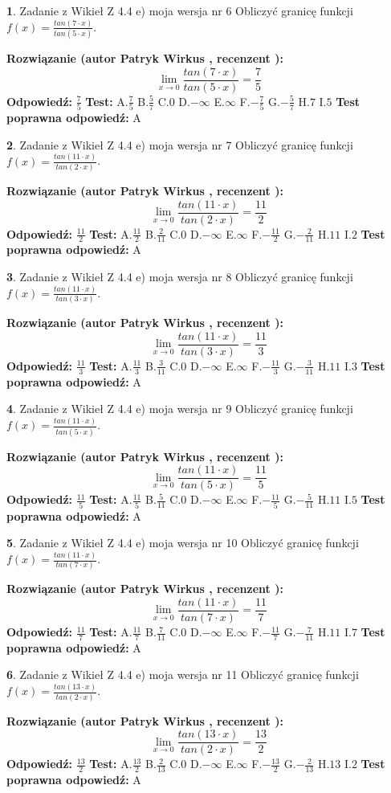 \documentclass[12pt, a4paper]{article}
\theoremstyle{definition} %
\newtheorem{zad}{}
\newcommand{\zadStart}[1]{\begin{zad}#1\newline}
\newcommand{\zadStop}{\end{zad}}
\newcommand{\rozwStart}[2]{\noindent \textbf{Rozwiązanie (autor #1 , recenzent #2): }\newline}
\newcommand{\rozwStop}{\newline}
\newcommand{\odpStart}{\noindent \textbf{Odpowiedź:}\newline}
\newcommand{\odpStop}{\newline}
\newcommand{\testStart}{\noindent \textbf{Test:}\newline}
\newcommand{\testStop}{\newline}
\newcommand{\kluczStart}{\noindent \textbf{Test poprawna odpowiedź:}\newline}
\newcommand{\kluczStop}{\newline}
\begin{document}
\zadStart{Zadanie z Wikieł Z 4.4 e) moja wersja nr 6}
Obliczyć granicę funkcji $f(x)=\frac{tan(7\cdot x)}{tan(5\cdot x)}$.
\zadStop
\rozwStart{Patryk Wirkus}{}
$$\lim\limits_{x\to 0}\frac{tan(7\cdot x)}{tan(5\cdot x)}=
\frac{7}{5}$$
\rozwStop
\odpStart
$\frac{7}{5}$
\odpStop
\testStart
A.$\frac{7}{5}$
B.$\frac{5}{7}$
C.$0$
D.$-\infty$
E.$\infty$
F.$-\frac{7}{5}$
G.$-\frac{5}{7}$
H.$7$
I.$5$
\testStop
\kluczStart
A
\kluczStop



\zadStart{Zadanie z Wikieł Z 4.4 e) moja wersja nr 7}
Obliczyć granicę funkcji $f(x)=\frac{tan(11\cdot x)}{tan(2\cdot x)}$.
\zadStop
\rozwStart{Patryk Wirkus}{}
$$\lim\limits_{x\to 0}\frac{tan(11\cdot x)}{tan(2\cdot x)}=
\frac{11}{2}$$
\rozwStop
\odpStart
$\frac{11}{2}$
\odpStop
\testStart
A.$\frac{11}{2}$
B.$\frac{2}{11}$
C.$0$
D.$-\infty$
E.$\infty$
F.$-\frac{11}{2}$
G.$-\frac{2}{11}$
H.$11$
I.$2$
\testStop
\kluczStart
A
\kluczStop



\zadStart{Zadanie z Wikieł Z 4.4 e) moja wersja nr 8}
Obliczyć granicę funkcji $f(x)=\frac{tan(11\cdot x)}{tan(3\cdot x)}$.
\zadStop
\rozwStart{Patryk Wirkus}{}
$$\lim\limits_{x\to 0}\frac{tan(11\cdot x)}{tan(3\cdot x)}=
\frac{11}{3}$$
\rozwStop
\odpStart
$\frac{11}{3}$
\odpStop
\testStart
A.$\frac{11}{3}$
B.$\frac{3}{11}$
C.$0$
D.$-\infty$
E.$\infty$
F.$-\frac{11}{3}$
G.$-\frac{3}{11}$
H.$11$
I.$3$
\testStop
\kluczStart
A
\kluczStop



\zadStart{Zadanie z Wikieł Z 4.4 e) moja wersja nr 9}
Obliczyć granicę funkcji $f(x)=\frac{tan(11\cdot x)}{tan(5\cdot x)}$.
\zadStop
\rozwStart{Patryk Wirkus}{}
$$\lim\limits_{x\to 0}\frac{tan(11\cdot x)}{tan(5\cdot x)}=
\frac{11}{5}$$
\rozwStop
\odpStart
$\frac{11}{5}$
\odpStop
\testStart
A.$\frac{11}{5}$
B.$\frac{5}{11}$
C.$0$
D.$-\infty$
E.$\infty$
F.$-\frac{11}{5}$
G.$-\frac{5}{11}$
H.$11$
I.$5$
\testStop
\kluczStart
A
\kluczStop



\zadStart{Zadanie z Wikieł Z 4.4 e) moja wersja nr 10}
Obliczyć granicę funkcji $f(x)=\frac{tan(11\cdot x)}{tan(7\cdot x)}$.
\zadStop
\rozwStart{Patryk Wirkus}{}
$$\lim\limits_{x\to 0}\frac{tan(11\cdot x)}{tan(7\cdot x)}=
\frac{11}{7}$$
\rozwStop
\odpStart
$\frac{11}{7}$
\odpStop
\testStart
A.$\frac{11}{7}$
B.$\frac{7}{11}$
C.$0$
D.$-\infty$
E.$\infty$
F.$-\frac{11}{7}$
G.$-\frac{7}{11}$
H.$11$
I.$7$
\testStop
\kluczStart
A
\kluczStop



\zadStart{Zadanie z Wikieł Z 4.4 e) moja wersja nr 11}
Obliczyć granicę funkcji $f(x)=\frac{tan(13\cdot x)}{tan(2\cdot x)}$.
\zadStop
\rozwStart{Patryk Wirkus}{}
$$\lim\limits_{x\to 0}\frac{tan(13\cdot x)}{tan(2\cdot x)}=
\frac{13}{2}$$
\rozwStop
\odpStart
$\frac{13}{2}$
\odpStop
\testStart
A.$\frac{13}{2}$
B.$\frac{2}{13}$
C.$0$
D.$-\infty$
E.$\infty$
F.$-\frac{13}{2}$
G.$-\frac{2}{13}$
H.$13$
I.$2$
\testStop
\kluczStart
A
\kluczStop
\end{document}
